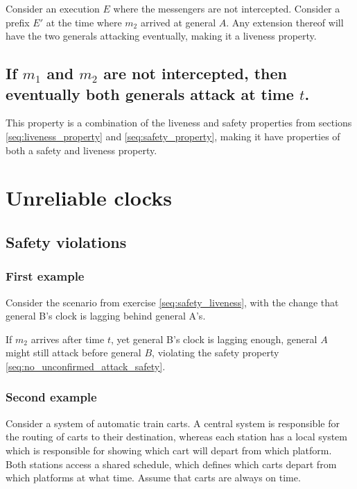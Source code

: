 \documentclass[a4paper]{scrreprt}
\begin{document}
Consider an execution $E$ where the messengers are not intercepted. Consider a
prefix $E'$ at the time where $m_2$ arrived at general $A$. Any extension
thereof will have the two generals attacking eventually, making it a liveness
property.

\subsection{If $m_1$ and $m_2$ are not intercepted, then eventually both generals attack at time $t$.}

This property is a combination of the liveness and safety properties from sections
\ref{seq:liveness_property} and \ref{seq:safety_property}, making it have
properties of both a safety and liveness property.

\section{Unreliable clocks}

\subsection{Safety violations}

\subsubsection{First example}

\label{seq:no_unonfirmed_attack_safety}

Consider the scenario from exercise \ref{seq:safety_liveness}, with the
change that general B's clock is lagging behind general A's.

If $m_2$ arrives after time $t$, yet general B's clock is lagging enough,
general $A$ might still attack before general $B$, violating the safety
property \ref{seq:no_unconfirmed_attack_safety}.

\subsubsection{Second example}

Consider a system of automatic train carts. A central system is responsible for
the routing of carts to their destination, whereas each station has a local
system which is responsible for showing which cart will depart from which
platform. Both stations access a shared schedule, which defines which carts
depart from which platforms at what time. Assume that carts are always on time.
\end{document}
